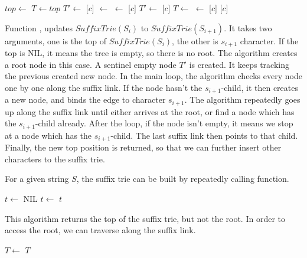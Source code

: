 \documentclass{article}
\begin{document}
\begin{algorithmic}
   
    \State $top \gets$ 
  \EndIf
  \State $T \gets top$
  \State $T' \gets$  
    \State {}[$c$] $\gets$ 
    \State {} $\gets$ [$c$]
    \State $T' \gets$ [$c$]
    \State $T \gets$ 
  \EndWhile
    \State {} $\gets$ [$c$]
  \EndIf
  \State \Return {}[$c$] 
\EndFunction
\end{algorithmic}

Function , updates $SuffixTrie(S_i)$ to $SuffixTrie(S_{i+1})$.
It takes two arguments, one is the top of $SuffixTrie(S_i)$, the other
is $s_{i+1}$ character. If the top is NIL, it means the tree is empty,
so there is no root. The algorithm creates a root node in this case.
A sentinel empty node $T'$ is created. It keeps tracking the previous
created new node. In the main loop, the algorithm checks every node
one by one along the suffix link. If the node hasn't the $s_{i+1}$-child,
it then creates a new node, and binds the edge to character $s_{i+1}$.
The algorithm repeatedly goes up along the suffix link until either
arrives at the root, or find a node which has the $s_{i+1}$-child already.
After the loop, if the node isn't empty, it means we stop at a node
which has the $s_{i+1}$-child.
The last suffix link then points to that child.
Finally, the new top position is returned, so that we can further
insert other characters to the suffix trie.

For a given string $S$, the suffix trie can be built by repeatedly
calling  function.

\begin{algorithmic}[1]
  \State $t \gets$ NIL
    \State $t \gets$ 
  \EndFor
  \State \Return $t$
\EndFunction
\end{algorithmic}

This algorithm returns the top of the suffix trie, but not the root.
In order to access the root, we can traverse along the suffix link.

\begin{algorithmic}[1]
    \State $T \gets$ 
  \EndWhile
  \State \Return $T$
\EndFunction
\end{algorithmic}
\end{document}
